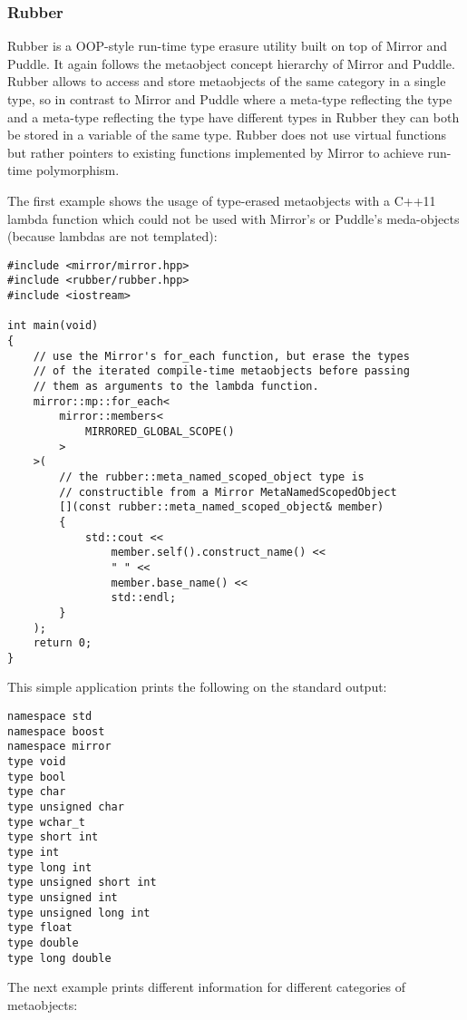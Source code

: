 \subsubsection{Rubber}

Rubber is a OOP-style run-time type erasure utility built on top
of Mirror and Puddle. It again follows the metaobject concept hierarchy of Mirror and Puddle.
Rubber allows to access and store metaobjects of the same category in a single
type, so in contrast to Mirror and Puddle where a meta-type reflecting the \verb@int@
type and a meta-type reflecting the \verb@double@ type have different types
in Rubber they can both be stored in a variable of the same type.
Rubber does not use virtual functions but rather pointers to existing
functions implemented by Mirror to achieve run-time polymorphism.

The first example shows the usage of type-erased metaobjects with a C++11
lambda function which could not be used with Mirror's or Puddle's meda-objects
(because lambdas are not templated):

\begin{lstlisting}
#include <mirror/mirror.hpp>
#include <rubber/rubber.hpp>
#include <iostream>

int main(void)
{
    // use the Mirror's for_each function, but erase the types
    // of the iterated compile-time metaobjects before passing
    // them as arguments to the lambda function.
    mirror::mp::for_each<
        mirror::members<
            MIRRORED_GLOBAL_SCOPE()
        >
    >(
        // the rubber::meta_named_scoped_object type is
        // constructible from a Mirror MetaNamedScopedObject
        [](const rubber::meta_named_scoped_object& member)
        {
            std::cout <<
                member.self().construct_name() <<
                " " <<
                member.base_name() <<
                std::endl;
        }
    );
    return 0;
}
\end{lstlisting}

This simple application prints the following on the standard output:

\begin{verbatim}
namespace std
namespace boost
namespace mirror
type void
type bool
type char
type unsigned char
type wchar_t
type short int
type int
type long int
type unsigned short int
type unsigned int
type unsigned long int
type float
type double
type long double
\end{verbatim}

The next example prints different information for different categories
of metaobjects:

